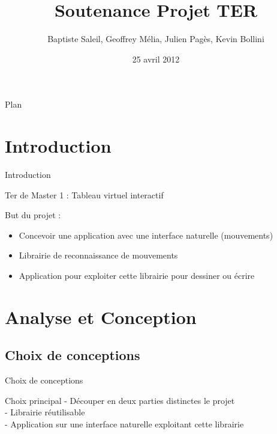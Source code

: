 \documentclass{beamer}
\title{Soutenance Projet TER}
\author{Baptiste Saleil, Geoffrey Mélia, Julien Pagès, Kevin Bollini}
\date{25 avril 2012}
\begin{document}
	\begin{frame}
		\titlepage
	\end{frame}

	\begin{frame}{Plan}
		\tableofcontents
	\end{frame}

	\section{Introduction}
		\begin{frame}{Introduction}
		\begin{center}
		\LARGE{Ter de Master 1 : Tableau virtuel interactif}
		\end{center}
		
		But du projet :
		\begin{itemize}
		\item Concevoir une application avec une interface naturelle (mouvements)
		\item Librairie de reconnaissance de mouvements
		\item Application pour exploiter cette librairie pour dessiner ou écrire
		\end{itemize}
		
		\end{frame}

		
	\section{Analyse et Conception}
	\subsection{Choix de conceptions}
		\begin{frame}{Choix de conceptions}
			
			\begin{block}{Choix principal}
				- Découper en deux parties distinctes le projet \\
				- Librairie réutilisable \\
				- Application sur une interface naturelle exploitant cette librairie \\
			\end{block}
			
		\end{frame}
		
\end{document}
